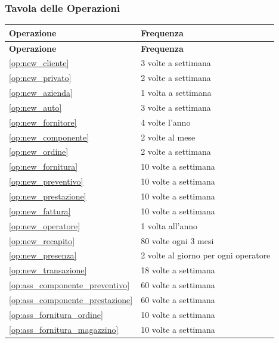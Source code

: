 		\subsubsection{Tavola delle Operazioni}
		
			\begin{longtable}{| p{6.2cm} | p{6.2cm} |}

				\hline
				\textbf{Operazione} & 
				\textbf{Frequenza} \\
				\hline
				
				\endfirsthead
				
				\hline
				\textbf{Operazione} & 
				\textbf{Frequenza} \\
				\hline
				
				\endhead
				
				\ref{op:new_cliente} & 3 volte a settimana \\ \hline
				\ref{op:new_privato} & 2 volte a settimana \\ \hline
				\ref{op:new_azienda} & 1 volta a settimana \\ \hline
				\ref{op:new_auto} & 3 volte a settimana \\ \hline
				\ref{op:new_fornitore} & 4 volte l'anno \\ \hline
				\ref{op:new_componente} & 2 volte al mese \\ \hline
				\ref{op:new_ordine} & 2 volte a settimana \\ \hline
				\ref{op:new_fornitura} & 10 volte a settimana \\ \hline
				\ref{op:new_preventivo} & 10 volte a settimana \\ \hline
				\ref{op:new_prestazione} & 10 volte a settimana \\ \hline
				\ref{op:new_fattura} & 10 volte a settimana \\ \hline
				\ref{op:new_operatore} & 1 volta all'anno \\ \hline
				\ref{op:new_recapito} & 80 volte ogni 3 mesi \\ \hline
				\ref{op:new_presenza} & 2 volte al giorno per ogni operatore \\ \hline
				\ref{op:new_transazione} & 18 volte a settimana \\ \hline

				\ref{op:ass_componente_preventivo} & 60 volte a settimana \\ \hline
				\ref{op:ass_componente_prestazione} & 60 volte a settimana \\ \hline
				\ref{op:ass_fornitura_ordine} & 10 volte a settimana \\ \hline
				\ref{op:ass_fornitura_magazzino} & 10 volte a settimana \\ \hline


\end{longtable}

